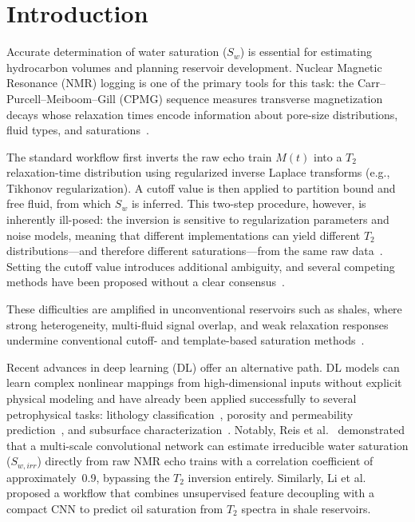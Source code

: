 \documentclass[runningheads]{llncs}
\begin{document}
\section{Introduction}
\label{sec:intro}

Accurate determination of water saturation ($S_w$) is essential for estimating hydrocarbon volumes
and planning reservoir development. Nuclear Magnetic Resonance (NMR) logging is one of the primary
tools for this task: the Carr--Purcell--Meiboom--Gill (CPMG) sequence measures transverse
magnetization decays whose relaxation times encode information about pore-size distributions,
fluid types, and saturations~\cite{ref_coates1999}.

The standard workflow first inverts the raw echo train $M(t)$ into a $T_2$ relaxation-time
distribution using regularized inverse Laplace transforms (e.g., Tikhonov regularization).
A cutoff value is then applied to partition bound and free fluid, from which $S_w$ is inferred.
This two-step procedure, however, is inherently ill-posed: the inversion is sensitive to
regularization parameters and noise models, meaning that different implementations can yield
different $T_2$ distributions---and therefore different saturations---from the same raw data~\cite{ref_deepswirr}.
Setting the cutoff value introduces additional ambiguity, and several competing methods have been
proposed without a clear consensus~\cite{ref_liu2022,ref_solatpour2018}.

These difficulties are amplified in unconventional reservoirs such as shales, where strong
heterogeneity, multi-fluid signal overlap, and weak relaxation responses undermine conventional
cutoff- and template-based saturation methods~\cite{ref_li2026}.

Recent advances in deep learning (DL) offer an alternative path. DL models can learn complex
nonlinear mappings from high-dimensional inputs without explicit physical modeling and have already
been applied successfully to several petrophysical tasks: lithology classification~\cite{ref_valentin2019},
porosity and permeability prediction~\cite{ref_bom2021}, and subsurface
characterization~\cite{ref_kurup2006}. Notably, Reis et al.~\cite{ref_deepswirr} demonstrated
that a multi-scale convolutional network can estimate irreducible water saturation ($S_{w,irr}$)
directly from raw NMR echo trains with a correlation coefficient of approximately~0.9, bypassing
the $T_2$ inversion entirely. Similarly, Li et al.~\cite{ref_li2026} proposed a workflow that
combines unsupervised feature decoupling with a compact CNN to predict oil saturation from
$T_2$ spectra in shale reservoirs.
\end{document}
